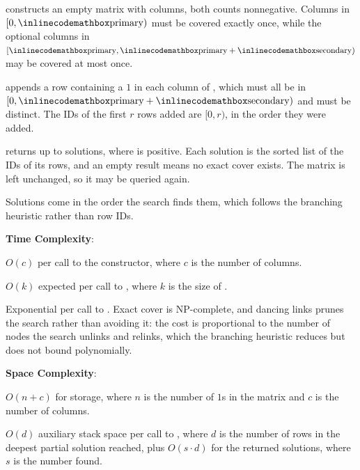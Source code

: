 \begin{compactitem}
  \item {} constructs an empty matrix with  columns, both counts nonnegative. Columns in $[0, {\inlinecodemath{primary}})$ must be covered exactly once, while the optional columns in $[{\inlinecodemath{primary}}, {\inlinecodemath{primary}} + {\inlinecodemath{secondary}})$ may be covered at most once.
  \item {} appends a row containing a $1$ in each column of , which must all be in $[0, {\inlinecodemath{primary}} + {\inlinecodemath{secondary}})$ and must be distinct. The IDs of the first $r$ rows added are $[0, r)$, in the order they were added.
  \item {} returns up to  solutions, where  is positive. Each solution is the sorted list of the IDs of its rows, and an empty result means no exact cover exists. The matrix is left unchanged, so it may be queried again.
\end{compactitem}

Solutions come in the order the search finds them, which follows the branching heuristic rather than row IDs.

\textbf{Time Complexity}:
\begin{compactitem}
  \item $O(c)$ per call to the constructor, where $c$ is the number of columns.
  \item $O(k)$ expected per call to , where $k$ is the size of .
  \item Exponential per call to . Exact cover is NP-complete, and dancing links prunes the search rather than avoiding it: the cost is proportional to the number of nodes the search unlinks and relinks, which the branching heuristic reduces but does not bound polynomially.
\end{compactitem}

\textbf{Space Complexity}:
\begin{compactitem}
  \item $O(n + c)$ for storage, where $n$ is the number of $1$s in the matrix and $c$ is the number of columns.
  \item $O(d)$ auxiliary stack space per call to , where $d$ is the number of rows in the deepest partial solution reached, plus $O(s \cdot d)$ for the returned solutions, where $s$ is the number found.
\end{compactitem}

